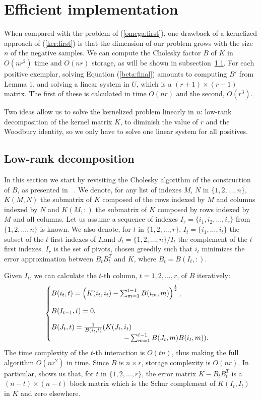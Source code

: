 
\section{Efficient implementation}\label{eff_imp}
When compared with the problem of (\ref{omega:first}), one drawback of a kernelized approach of (\ref{ker:first}) is that the dimension of our problem grows with the size $n$ of the negative samples.
We can compute the Cholesky factor $B$ of $K$ in $O(nr^2)$ time and $O(nr)$ storage, as will be shown in subsection~\ref{low-rank}. 
For each positive exemplar, solving Equation (\ref{beta:final}) amounts to computing $B'$ from Lemma 1, and solving a linear system in $U$, which is a $(r+1)\times (r+1)$ matrix. The first of these is calculated in time $O(nr)$ and the second, $O(r^3)$.

Two ideas allow us to solve the kernelized problem linearly in $n$: low-rank decomposition of the kernel matrix $K$, to diminish the value of $r$ and the Woodbury identity, so we only have to solve one linear system for all positives. 

\subsection{Low-rank decomposition} \label{low-rank}
In this section we start by revisiting the Cholesky algorithm of the construction of $B$, as presented in ~\cite{BaJo05,FiSc01}. 
We denote, for any list of indexes $M$, $N$ in $\{1,2,...,n\}$, $K(M,N)$ the submatrix of $K$ composed of the rows indexed by $M$ and columns indexed by $N$ and $K(M,:)$ the submatrix of $K$ composed by rows indexed by $M$ and all columns.
Let us assume a sequence of indexes $I_r=\{i_1,i_2,\dots ,i_r\}$ from $\{1,2,\dots, n\}$ is known. 
We also denote, for $t$ in $\{1,2,...,r\}$, $I_t=\{i_1,...,i_t\}$ the subset of the $t$ first indexes of $I_r$and $J_t=\{1,2,...,n\}/ I_t$ the complement of the $t$ first indexes.
$I_r$ is the set of pivots, chosen greedily such that $i_t$ minimizes the error approximation between $B_tB_t^T$ and $K$, where $B_t=B(I_t,:)$. 

Given $I_t$, we can calculate the $t$-th column, $t=1,2,...,r$, of $B$ iteratively:
\begin{align}
\begin{cases}
\vspace{3 mm}
B(i_t, t) = \left(K(i_t,i_t)-\sum_{m=1}^{t-1} B(i_{m},m)  \right)^{\frac{1}{2}},\\
\vspace{3 mm}
B(I_{t-1},t) = 0,\\
B(J_t, t) = \frac{1}{B(i_t,t)}(K(J_t,i_t)\\
\ \ \ \ \ \ \ \ \ \ \ \ \ \ \ \ \ \ \ \ \ \ \ \ \ \ \  \ \ \ \  -\sum_{m=1}^{t-1}B(J_t,m)B(i_t,m)
).\end{cases}\label{icd:algo}
\end{align}
The time complexity of the $t$-th interaction is $O(tn)$, thus making the full algorithm $O(nr^2)$ in time. Since $B$ is $n\times r$, storage complexity is $O(nr)$. In particular, \cite{BaJo05} shows us that, for $t$ in $\{1,2,...,r\}$, the error matrix $K-B_tB_t^T$ is a $(n-t)\times (n-t)$ block matrix which is the Schur complement of $K(I_t,I_t)$ in $K$ and zero elsewhere.

